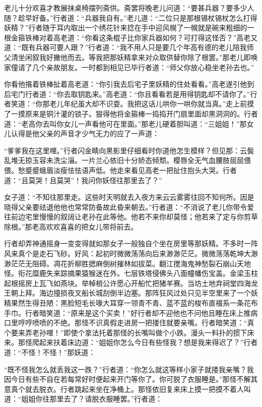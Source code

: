 \documentclass[12pt,UTF8]{ctexbook}
\begin{document}
{老儿十分欢喜才教展抹桌椅摆列斋供。斋罢将晚老儿问道：“要甚兵器？要多少人随？趁早好备。”行者道：“兵器我自有。”老儿道：“二位只是那根锡杖锡杖怎么打得妖精？”行者随于耳内取出一个绣花针来捻在手中迎风幌了一幌就是碗来粗细的一根金箍铁棒对着高老道：“你看这条棍子比你家兵器如何？可打得这怪否？”高老又道：“既有兵器可要人跟？”行者道：“我不用人只是要几个年高有德的老儿陪我师父清坐闲叙我好撇他而去。等我把那妖精拿来对众取供替你除了根罢。”那老儿即唤家僮请了几个亲故朋友。一时都到相见已毕行者道：“师父你放心稳坐老孙去也。”

你看他揝着铁棒扯着高老道：“你引我去后宅子里妖精的住处看看。”高老遂引他到后宅门行者道：“你去取钥匙来。”高老道：“你且看看若是用得钥匙却不请你了。”行者笑道：“你那老儿年纪虽大却不识耍。我把这话儿哄你一哄你就当真。”走上前摸了一摸原来是铜汁灌的锁子。狠得他将金箍棒一捣捣开门扇里面却黑洞洞的。行者道：“老高你去叫你女儿一声看他可在里面。”那老儿硬着胆叫道：“三姐姐！”那女儿认得是他父亲的声音才少气无力的应了一声道：

“爹爹我在这里哩。”行者闪金睛向黑影里仔细看时你道他怎生模样？但见那：云鬓乱堆无掠玉容未洗尘淄。一片兰心依旧十分娇态倾颓。樱唇全无气血腰肢屈屈偎偎。愁蹙蹙蛾眉淡瘦怯怯语声低。他走来看见高老一把扯住抱头大哭。行者道：“且莫哭！且莫哭”！我问你妖怪往那里去了？”

女子道：“不知往那里走。这些时天明就去入夜方来云云雾雾往回不知何所。因是晓得父亲要祛退他他也常常防备故此昏来朝去。”行者道：“不消说了老儿你带令爱往前边宅里慢慢的叙阔让老孙在此等他。他若不来你却莫怪；他若来了定与你剪草除根。”那老高欢欢喜喜的把女儿带将前去。

行者却弄神通摇身一变变得就如那女子一般独自个坐在房里等那妖精。不多时一阵风来真个是走石飞砂。好风：起初时微微荡荡向后来渺渺茫茫。微微荡荡乾坤大渺渺茫茫无阻碍。凋花折柳胜揌麻倒树摧林如拔菜。翻江搅海鬼神愁裂石崩山天地怪。衔花糜鹿失来踪摘果猿猴迷在外。七层铁塔侵佛头八面幢幡伤宝盖。金梁玉柱起根摇房上瓦飞如燕块。举棹梢公许愿心开船忙把猪羊赛。当坊土地弃祠堂四海龙王朝上拜。海边撞损夜叉船长城刮倒半边塞。那阵狂风过处只见半空里来了一个妖精果然生得丑陋：黑脸短毛长喙大耳穿一领青不青、蓝不蓝的梭布直裰系一条花布手巾。行者暗笑道：“原来是这个买卖！”好行者却不迎他也不问他且睡在床上推病口里哼哼喷喷的不绝。那怪不识真假走进房一把搂住就要亲嘴。行者暗笑道：“真个要来弄老孙哩！”即使个拿法托着那怪的长嘴叫做个小跌。漫头一料扑的掼下床来。那怪爬起来扶着床边道：“姐姐你怎么今日有些怪我？想是我来得迟了？”行者道：“不怪！不怪！”那妖道：

“既不怪我怎么就丢我这一跌？”行者道：“你怎么就这等样小家子就搂我亲嘴？我因今日有些不自在若每常好时便起来开门等你了。你可脱了衣服睡是。”那怪不解其意真个就去脱衣。行者跳起来坐在净桶上。那怪依旧复来床上摸一把摸不着人叫道：“姐姐你往那里去了？请脱衣服睡罢。”行者道：

}
\end{document}
